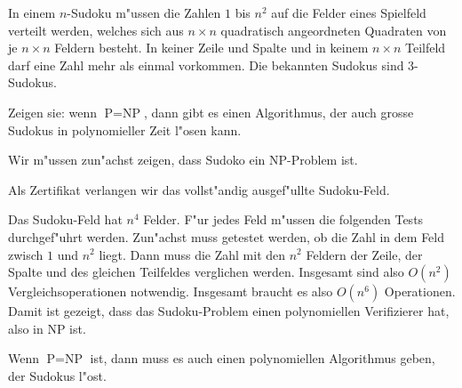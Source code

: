 In einem
$n$-Sudoku m"ussen die Zahlen $1$ bis $n^2$ auf die Felder eines
Spielfeld verteilt werden, welches sich aus $n\times n$ quadratisch
angeordneten Quadraten von je $n\times n$ Feldern besteht.
In keiner Zeile und Spalte und in keinem $n\times n$ Teilfeld
darf eine Zahl mehr als einmal vorkommen. Die bekannten Sudokus
sind 3-Sudokus.

Zeigen sie: wenn $\text{P}=\text{NP}$, dann gibt es einen Algorithmus,
der auch grosse Sudokus in polynomieller Zeit l"osen kann.

\begin{loesung}
Wir m"ussen zun"achst zeigen, dass Sudoko ein NP-Problem ist.

Als Zertifikat verlangen wir das vollst"andig ausgef"ullte Sudoku-Feld.

Das Sudoku-Feld hat $n^4$ Felder. F"ur jedes Feld m"ussen die
folgenden Tests durchgef"uhrt werden. Zun"achst muss getestet
werden, ob die Zahl in dem Feld zwisch $1$ und $n^2$ liegt.
Dann muss die Zahl mit den $n^2$ Feldern der Zeile, der Spalte
und des gleichen Teilfeldes verglichen werden. Insgesamt sind
also $O(n^2)$ Vergleichsoperationen notwendig.
Insgesamt braucht es also $O(n^6)$ 
Operationen. Damit ist gezeigt, dass das Sudoku-Problem einen polynomiellen
Verifizierer hat, also in NP ist.

Wenn $\text{P}=\text{NP}$ ist, dann muss es auch einen polynomiellen
Algorithmus geben, der Sudokus l"ost.
\end{loesung}

